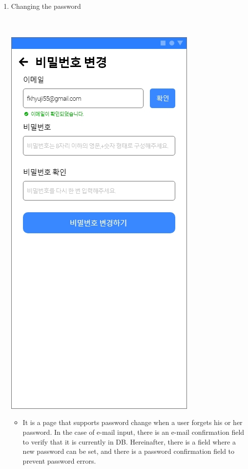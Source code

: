 \documentclass[conference]{IEEEtran}
\begin{document}
\begin{enumerate}
    \item Changing the password \\ \\ \\
    \centerline{\includegraphics[scale=0.32]{비밀번호 변경.jpg}}
    \begin{itemize}
    \item[] It is a page that supports password change when a user forgets his or her password. In the case of e-mail input, there is an e-mail confirmation field to verify that it is currently in DB. Hereinafter, there is a field where a new password can be set, and there is a password confirmation field to prevent password errors. \\ \\ \\ \\ \\ \\ \\ \\ \\ \\ \\ \\ \\ \\
    \end{itemize}
    \end{enumerate}{}
    
\end{document}
